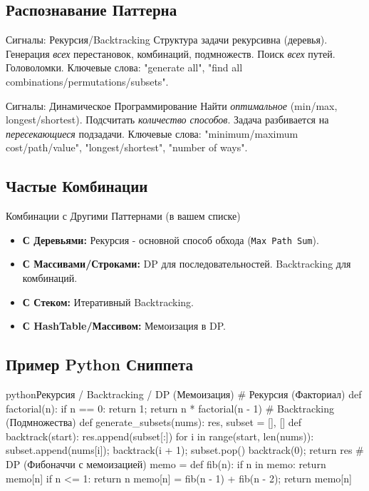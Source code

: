 \subsection{Распознавание Паттерна}
\begin{myblock}{Сигналы: Рекурсия/Backtracking}
    Структура задачи рекурсивна (деревья). Генерация \emph{всех} перестановок, комбинаций, подмножеств. Поиск \emph{всех} путей. Головоломки. \newline
    Ключевые слова: "generate all", "find all combinations/permutations/subsets".
\end{myblock}
\begin{myblock}{Сигналы: Динамическое Программирование}
    Найти \emph{оптимальное} (min/max, longest/shortest). Подсчитать \emph{количество способов}. Задача разбивается на \emph{пересекающиеся} подзадачи. \newline
    Ключевые слова: "minimum/maximum cost/path/value", "longest/shortest", "number of ways".
\end{myblock}

\subsection{Частые Комбинации}
\begin{myblock}{Комбинации с Другими Паттернами (в вашем списке)}
    \begin{itemize}[nosep, leftmargin=*]
        \item \textbf{С Деревьями:} Рекурсия - основной способ обхода (\texttt{Max Path Sum}).
        \item \textbf{С Массивами/Строками:} DP для последовательностей. Backtracking для комбинаций.
        \item \textbf{С Стеком:} Итеративный Backtracking.
        \item \textbf{С HashTable/Массивом:} Мемоизация в DP.
    \end{itemize}
\end{myblock}

\subsection{Пример Python Сниппета}
\begin{codebox}{python}{Рекурсия / Backtracking / DP (Мемоизация)}
# Рекурсия (Факториал)
def factorial(n):
    if n == 0: return 1; return n * factorial(n - 1)
# Backtracking (Подмножества)
def generate_subsets(nums):
    res, subset = [], []
    def backtrack(start):
        res.append(subset[:])
        for i in range(start, len(nums)):
            subset.append(nums[i]); backtrack(i + 1); subset.pop()
    backtrack(0); return res
# DP (Фибоначчи с мемоизацией)
memo = {}
def fib(n):
    if n in memo: return memo[n]
    if n <= 1: return n
    memo[n] = fib(n - 1) + fib(n - 2); return memo[n]
\end{codebox}

